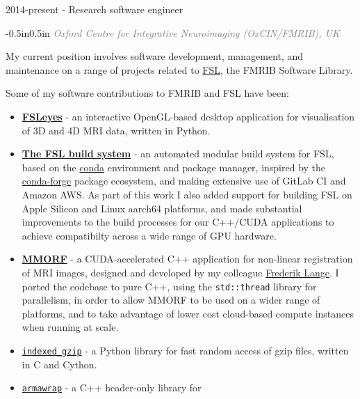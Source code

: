 \documentclass{resume}
\begin{document}
\begin{category}{2014-present - Research software engineer}
\citemnobullet
\begin{changemargin}{-0.5in}{0.5in}
\textcolor{grey}{\textit{Oxford Centre for Integrative Neuroimaging (OxCIN/FMRIB), UK}}
\end{changemargin}

\citemnobullet My current position involves software development, management, and
maintenance on a range of projects related to \href{https://fsl.fmrib.ox.ac.uk/fsl/docs/}{FSL},
the FMRIB Software Library.\newline

Some of my software contributions to FMRIB and FSL have been:\newline

\begin{itemize}
\item \href{https://open.oxcin.ox.ac.uk/pages/fsl/fsleyes/fsleyes/userdoc/}{\textbf{FSLeyes}} - an interactive OpenGL-based
desktop application for visualisation of 3D and 4D MRI data, written
in Python.
\item \href{https://fsl.fmrib.ox.ac.uk/fsl/docs/development/management/index.html}{\textbf{The FSL build system}} - an automated modular
build system for FSL, based on the \href{https://docs.conda.io/}{conda}
environment and package manager, inspired by the \href{https://conda-forge.org/}{conda-forge} package ecosystem, and making extensive use of
GitLab CI and Amazon AWS. As part of this work I also added support
for building FSL on Apple Silicon and Linux aarch64 platforms, and
made substantial improvements to the build processes for our C++/CUDA
applications to achieve compatibilty across a wide range of GPU hardware.
\item \href{https://git.fmrib.ox.ac.uk/fsl/MMORF}{\textbf{MMORF}} - a CUDA-accelerated C++ application
for non-linear registration of MRI images, designed and developed by
my colleague \href{https://www.ndcn.ox.ac.uk/team/frederik-lange}{Frederik Lange}. I ported the
codebase to pure C++, using the \texttt{std::thread} library for
parallelism, in order to allow MMORF to be used on a wider range of
platforms, and to take advantage of lower cost cloud-based compute
instances when running at scale.
\item \href{https://github.com/pauldmccarthy/indexed_gzip}{\texttt{indexed\_gzip}} - a Python library for fast
random access of gzip files, written in C and Cython.
\item \href{https://git.fmrib.ox.ac.uk/fsl/armawrap}{\texttt{armawrap}} - a C++ header-only library for

\end{itemize}
\end{category}
\end{document}
